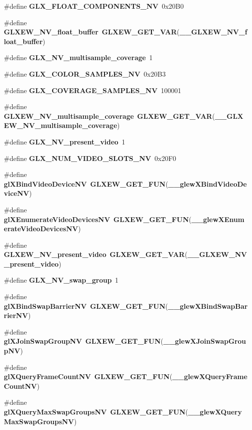 \begin{DoxyCompactItemize}
\#define {\bf G\+L\+X\+\_\+\+F\+L\+O\+A\+T\+\_\+\+C\+O\+M\+P\+O\+N\+E\+N\+T\+S\+\_\+\+NV}~0x20\+B0
\item 
\#define {\bf G\+L\+X\+E\+W\+\_\+\+N\+V\+\_\+float\+\_\+buffer}~{\bf G\+L\+X\+E\+W\+\_\+\+G\+E\+T\+\_\+\+V\+AR}({\bf \+\_\+\+\_\+\+G\+L\+X\+E\+W\+\_\+\+N\+V\+\_\+float\+\_\+buffer})
\item 
\#define {\bf G\+L\+X\+\_\+\+N\+V\+\_\+multisample\+\_\+coverage}~1
\item 
\#define {\bf G\+L\+X\+\_\+\+C\+O\+L\+O\+R\+\_\+\+S\+A\+M\+P\+L\+E\+S\+\_\+\+NV}~0x20\+B3
\item 
\#define {\bf G\+L\+X\+\_\+\+C\+O\+V\+E\+R\+A\+G\+E\+\_\+\+S\+A\+M\+P\+L\+E\+S\+\_\+\+NV}~100001
\item 
\#define {\bf G\+L\+X\+E\+W\+\_\+\+N\+V\+\_\+multisample\+\_\+coverage}~{\bf G\+L\+X\+E\+W\+\_\+\+G\+E\+T\+\_\+\+V\+AR}({\bf \+\_\+\+\_\+\+G\+L\+X\+E\+W\+\_\+\+N\+V\+\_\+multisample\+\_\+coverage})
\item 
\#define {\bf G\+L\+X\+\_\+\+N\+V\+\_\+present\+\_\+video}~1
\item 
\#define {\bf G\+L\+X\+\_\+\+N\+U\+M\+\_\+\+V\+I\+D\+E\+O\+\_\+\+S\+L\+O\+T\+S\+\_\+\+NV}~0x20\+F0
\item 
\#define {\bf gl\+X\+Bind\+Video\+Device\+NV}~{\bf G\+L\+X\+E\+W\+\_\+\+G\+E\+T\+\_\+\+F\+UN}({\bf \+\_\+\+\_\+glew\+X\+Bind\+Video\+Device\+NV})
\item 
\#define {\bf gl\+X\+Enumerate\+Video\+Devices\+NV}~{\bf G\+L\+X\+E\+W\+\_\+\+G\+E\+T\+\_\+\+F\+UN}({\bf \+\_\+\+\_\+glew\+X\+Enumerate\+Video\+Devices\+NV})
\item 
\#define {\bf G\+L\+X\+E\+W\+\_\+\+N\+V\+\_\+present\+\_\+video}~{\bf G\+L\+X\+E\+W\+\_\+\+G\+E\+T\+\_\+\+V\+AR}({\bf \+\_\+\+\_\+\+G\+L\+X\+E\+W\+\_\+\+N\+V\+\_\+present\+\_\+video})
\item 
\#define {\bf G\+L\+X\+\_\+\+N\+V\+\_\+swap\+\_\+group}~1
\item 
\#define {\bf gl\+X\+Bind\+Swap\+Barrier\+NV}~{\bf G\+L\+X\+E\+W\+\_\+\+G\+E\+T\+\_\+\+F\+UN}({\bf \+\_\+\+\_\+glew\+X\+Bind\+Swap\+Barrier\+NV})
\item 
\#define {\bf gl\+X\+Join\+Swap\+Group\+NV}~{\bf G\+L\+X\+E\+W\+\_\+\+G\+E\+T\+\_\+\+F\+UN}({\bf \+\_\+\+\_\+glew\+X\+Join\+Swap\+Group\+NV})
\item 
\#define {\bf gl\+X\+Query\+Frame\+Count\+NV}~{\bf G\+L\+X\+E\+W\+\_\+\+G\+E\+T\+\_\+\+F\+UN}({\bf \+\_\+\+\_\+glew\+X\+Query\+Frame\+Count\+NV})
\item 
\#define {\bf gl\+X\+Query\+Max\+Swap\+Groups\+NV}~{\bf G\+L\+X\+E\+W\+\_\+\+G\+E\+T\+\_\+\+F\+UN}({\bf \+\_\+\+\_\+glew\+X\+Query\+Max\+Swap\+Groups\+NV})

\end{DoxyCompactItemize}
